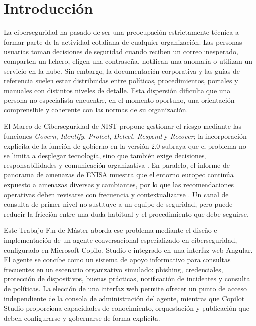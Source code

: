 \chapter{Introducción}
\label{chap:introduccion}

La ciberseguridad ha pasado de ser una preocupación estrictamente técnica a
formar parte de la actividad cotidiana de cualquier organización. Las personas
usuarias toman decisiones de seguridad cuando reciben un correo inesperado,
comparten un fichero, eligen una contraseña, notifican una anomalía o utilizan
un servicio en la nube. Sin embargo, la documentación corporativa y las guías
de referencia suelen estar distribuidas entre políticas, procedimientos,
portales y manuales con distintos niveles de detalle. Esta dispersión dificulta
que una persona no especialista encuentre, en el momento oportuno, una
orientación comprensible y coherente con las normas de su organización.

El Marco de Ciberseguridad de NIST propone gestionar el riesgo mediante las
funciones \emph{Govern}, \emph{Identify}, \emph{Protect}, \emph{Detect},
\emph{Respond} y \emph{Recover}; la incorporación explícita de la función de
gobierno en la versión 2.0 subraya que el problema no se limita a desplegar
tecnología, sino que también exige decisiones, responsabilidades y comunicación
organizativa \cite{nistCsf2024}. En paralelo, el informe de panorama de
amenazas de ENISA muestra que el entorno europeo continúa expuesto a amenazas
diversas y cambiantes, por lo que las recomendaciones operativas deben revisarse
con frecuencia y contextualizarse \cite{enisaThreat2025}. Un canal de consulta
de primer nivel no sustituye a un equipo de seguridad, pero puede reducir la
fricción entre una duda habitual y el procedimiento que debe seguirse.

Este Trabajo Fin de Máster aborda ese problema mediante el diseño e
implementación de un agente conversacional especializado en ciberseguridad,
configurado en Microsoft Copilot Studio e integrado en una interfaz web Angular.
El agente se concibe como un sistema de apoyo informativo para consultas
frecuentes en un escenario organizativo simulado: phishing, credenciales,
protección de dispositivos, buenas prácticas, notificación de incidentes y
consulta de políticas. La elección de una interfaz web permite ofrecer un punto
de acceso independiente de la consola de administración del agente, mientras
que Copilot Studio proporciona capacidades de conocimiento, orquestación y
publicación que deben configurarse y gobernarse de forma explícita.

